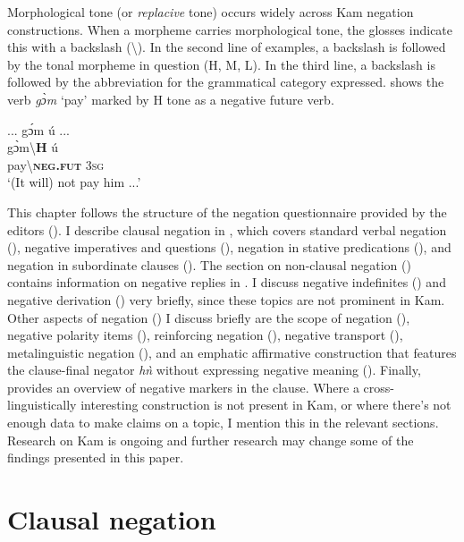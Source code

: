 \documentclass[output=paper,colorlinks,citecolor=brown]{langscibook}
\begin{document}
Morphological tone (or \textit{replacive} tone) occurs widely across Kam negation constructions. When a morpheme carries morphological tone, the glosses indicate this with a backslash ({\textbackslash}). In the second line of examples, a backslash is followed by the tonal morpheme in question (H, M, L). In the third line, a backslash is followed by the abbreviation for the grammatical category expressed.  shows the verb \textit{gɔ̀m} ‘pay’ marked by H tone as a negative future verb.

\ea\label{ex:kam:5}
    \glll ... gɔ́m ú ...\\
        {} gɔ̀m{\textbackslash}\textbf{H} ú \\
        {} pay{\textbackslash}\textbf{\textsc{neg}.\textsc{fut}} 3\textsc{sg} \\
    \glt ‘(It will) not pay him ...’
\z 

This chapter follows the structure of the negation questionnaire provided by the editors ().
I describe clausal negation in , which covers standard verbal negation (), negative imperatives and questions (), negation in stative predications (), and negation in subordinate clauses (). The section on non-clausal negation () contains information on negative replies in . I discuss negative indefinites () and negative derivation () very briefly, since these topics are not prominent in Kam. Other aspects of negation () I discuss briefly are the scope of negation (), negative polarity items (), reinforcing negation (), negative transport (), metalinguistic negation (), and an emphatic affirmative construction that features the clause-final negator \textit{hǹ} without expressing negative meaning (). Finally,  provides an overview of negative markers in the clause. Where a cross-linguistically interesting construction is not present in Kam, or where there’s not enough data to make claims on a topic, I mention this in the relevant sections. Research on Kam is ongoing and further research may change some of the findings presented in this paper.

\section{Clausal negation}\label{sec:kam:2}
\end{document}
